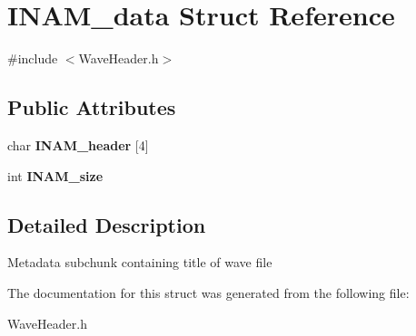 \hypertarget{structINAM__data}{}\section{I\+N\+A\+M\+\_\+data Struct Reference}
\label{structINAM__data}


{\ttfamily \#include $<$Wave\+Header.\+h$>$}

\subsection*{Public Attributes}
\begin{DoxyCompactItemize}
\item 
\mbox{\label{structINAM__data_a12017e0622dd9ff7258a47595766fc89}} 
char {\bfseries I\+N\+A\+M\+\_\+header} \mbox{[}4\mbox{]}
\item 
\mbox{\label{structINAM__data_a926a2539d627fa09d477b6ff09c6c0c4}} 
int {\bfseries I\+N\+A\+M\+\_\+size}
\end{DoxyCompactItemize}


\subsection{Detailed Description}
Metadata subchunk containing title of wave file 

The documentation for this struct was generated from the following file\+:\begin{DoxyCompactItemize}
\item 
Wave\+Header.\+h\end{DoxyCompactItemize}
